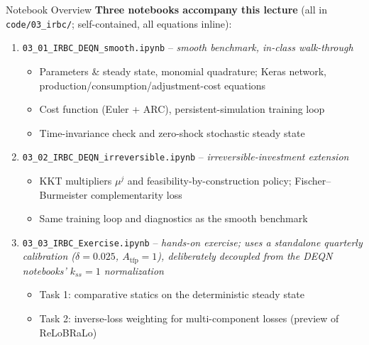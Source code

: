 \documentclass[aspectratio=169,11pt]{beamer}
\begin{document}
\begin{frame}{Notebook Overview}
\footnotesize
\textbf{Three notebooks accompany this lecture} (all in \texttt{code/03\_irbc/}; self-contained, all equations inline):

\vspace{0.2em}
\begin{enumerate}\itemsep1pt
    \item \texttt{03\_01\_IRBC\_DEQN\_smooth.ipynb} -- \emph{smooth benchmark, in-class walk-through}
    \begin{itemize}\itemsep0pt
        \item Parameters \& steady state, monomial quadrature; Keras network, production/consumption/adjustment-cost equations
        \item Cost function (Euler + ARC), persistent-simulation training loop
        \item Time-invariance check and zero-shock stochastic steady state
    \end{itemize}

    \item \texttt{03\_02\_IRBC\_DEQN\_irreversible.ipynb} -- \emph{irreversible-investment extension}
    \begin{itemize}\itemsep0pt
        \item KKT multipliers $\mu^j$ and feasibility-by-construction policy; Fischer--Burmeister complementarity loss
        \item Same training loop and diagnostics as the smooth benchmark
    \end{itemize}

    \item \texttt{03\_03\_IRBC\_Exercise.ipynb} -- \emph{hands-on exercise; uses a \emph{standalone} quarterly calibration ($\delta=0.025$, $A_{\mathrm{tfp}}=1$), deliberately decoupled from the DEQN notebooks' $k_{ss}=1$ normalization}
    \begin{itemize}\itemsep0pt
        \item Task 1: comparative statics on the deterministic steady state
        \item Task 2: inverse-loss weighting for multi-component losses (preview of ReLoBRaLo)
    \end{itemize}
\end{enumerate}
\end{frame}
\end{document}
